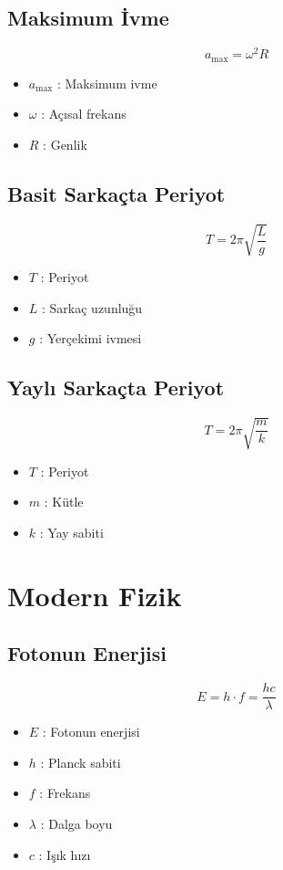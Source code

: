 \documentclass[a4paper, 11pt, titlepage]{article}
\begin{document}
\subsection{Maksimum İvme}
\[
a_{\mathrm{max}} = \omega^2 R
\]
\begin{itemize}
  \item $a_{\mathrm{max}}$ : Maksimum ivme
  \item $\omega$ : Açısal frekans
  \item $R$ : Genlik
\end{itemize}

\subsection{Basit Sarkaçta Periyot}
\[
T = 2\pi \sqrt{\frac{L}{g}}
\]
\begin{itemize}
  \item $T$ : Periyot
  \item $L$ : Sarkaç uzunluğu
  \item $g$ : Yerçekimi ivmesi
\end{itemize}


\subsection{Yaylı Sarkaçta Periyot}
\[
T = 2\pi \sqrt{\frac{m}{k}}
\]
\begin{itemize}
  \item $T$ : Periyot
  \item $m$ : Kütle
  \item $k$ : Yay sabiti
\end{itemize}
\section{Modern Fizik}
\subsection{Fotonun Enerjisi}
\[
E = h \cdot f = \frac{h c}{\lambda}
\]
\begin{itemize}
  \item $E$ : Fotonun enerjisi
  \item $h$ : Planck sabiti
  \item $f$ : Frekans
  \item $\lambda$ : Dalga boyu
  \item $c$ : Işık hızı
\end{itemize}
\end{document}
